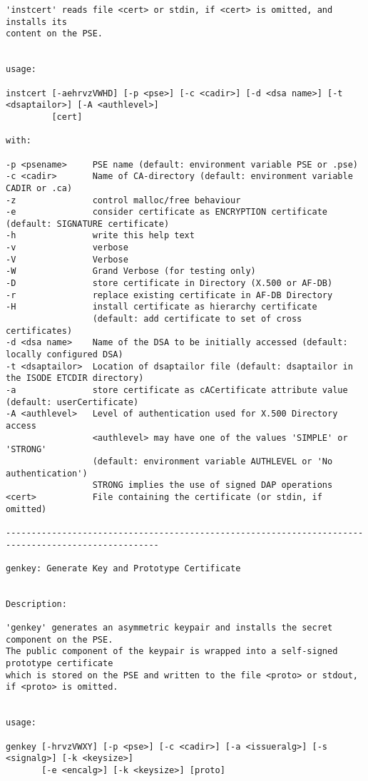 {\begin{verbatim}
'instcert' reads file <cert> or stdin, if <cert> is omitted, and installs its
content on the PSE.


usage:

instcert [-aehrvzVWHD] [-p <pse>] [-c <cadir>] [-d <dsa name>] [-t <dsaptailor>] [-A <authlevel>] 
         [cert]

with:

-p <psename>     PSE name (default: environment variable PSE or .pse)
-c <cadir>       Name of CA-directory (default: environment variable CADIR or .ca)
-z               control malloc/free behaviour
-e               consider certificate as ENCRYPTION certificate (default: SIGNATURE certificate)
-h               write this help text
-v               verbose
-V               Verbose
-W               Grand Verbose (for testing only)
-D               store certificate in Directory (X.500 or AF-DB)
-r               replace existing certificate in AF-DB Directory
-H               install certificate as hierarchy certificate
                 (default: add certificate to set of cross certificates)
-d <dsa name>    Name of the DSA to be initially accessed (default: locally configured DSA)
-t <dsaptailor>  Location of dsaptailor file (default: dsaptailor in the ISODE ETCDIR directory)
-a               store certificate as cACertificate attribute value (default: userCertificate)
-A <authlevel>   Level of authentication used for X.500 Directory access
                 <authlevel> may have one of the values 'SIMPLE' or 'STRONG'
                 (default: environment variable AUTHLEVEL or 'No authentication')
                 STRONG implies the use of signed DAP operations
<cert>           File containing the certificate (or stdin, if omitted)

----------------------------------------------------------------------------------------------------

genkey: Generate Key and Prototype Certificate


Description:

'genkey' generates an asymmetric keypair and installs the secret component on the PSE.
The public component of the keypair is wrapped into a self-signed prototype certificate
which is stored on the PSE and written to the file <proto> or stdout, if <proto> is omitted.


usage:

genkey [-hrvzVWXY] [-p <pse>] [-c <cadir>] [-a <issueralg>] [-s <signalg>] [-k <keysize>]
       [-e <encalg>] [-k <keysize>] [proto]


\end{verbatim}}

